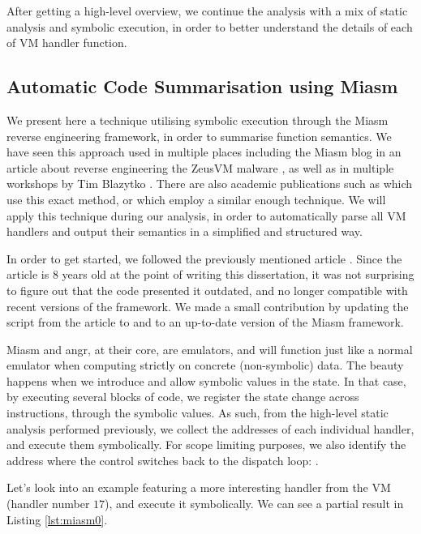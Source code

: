 After getting a high-level overview, we continue the analysis with a mix of static analysis and symbolic execution, in order to better understand the details of each of \gls{VM} handler function.

\subsection{Automatic Code Summarisation using Miasm}
\label{sec:miasm}

We present here a technique utilising symbolic execution through the Miasm \cite{miasm} reverse engineering framework, in order to summarise function semantics. We have seen this approach used in multiple places including the Miasm blog in an article about reverse engineering the ZeusVM malware \cite{zeusvm_miasm}, as well as in multiple workshops by Tim Blazytko \cite{tim_miasm}. There are also academic publications such as \cite{liang2018} which use this exact method, or \cite{symbolic_deobf_2018} which employ a similar enough technique. We will apply this technique during our analysis, in order to automatically parse all \gls{VM} handlers and output their semantics in a simplified and structured way. 

In order to get started, we followed the previously mentioned article \cite{zeusvm_miasm}. Since the article is 8 years old at the point of writing this dissertation, it was not surprising to figure out that the code presented it outdated, and no longer compatible with recent versions of the framework. We made a small contribution by updating the script from the article to  and to an up-to-date version of the Miasm framework.

Miasm and angr, at their core, are emulators, and will function just like a normal emulator when computing strictly on concrete (non-symbolic) data. The beauty happens when we introduce and allow symbolic values in the state. In that case, by executing several blocks of code, we register the state change across instructions, through the symbolic values. As such, from the high-level static analysis performed previously, we collect the addresses of each individual handler, and execute them symbolically. For scope limiting purposes, we also identify the address where the control switches back to the dispatch loop: . 

Let's look into an example featuring a more interesting handler from the  \gls{VM} (handler number $17$), and execute it symbolically. We can see a partial result in Listing \ref{lst:miasm0}. 

